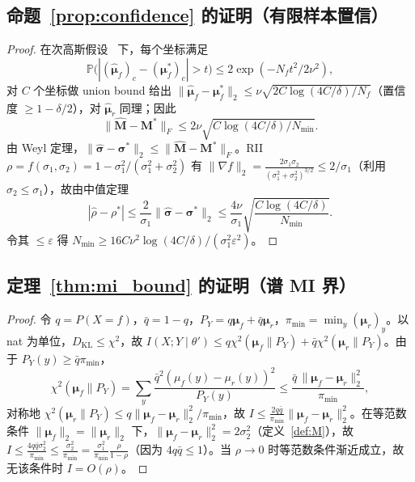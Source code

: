 \subsection{命题~\ref{prop:confidence} 的证明（有限样本置信）}
\label{app:confidence}
\begin{proof}
在次高斯假设~\cite{vershynin2018high} 下，每个坐标满足
\begin{equation}
\mathbb{P}\bigl(|(\hat{\boldsymbol{\mu}}_f)_c-(\boldsymbol{\mu}_f^*)_c|>t\bigr)\le 2\exp(-N_ft^2/2\nu^2),
\end{equation}
对 $C$ 个坐标做 union bound 给出 $\|\hat{\boldsymbol{\mu}}_f-\boldsymbol{\mu}_f^*\|_2\le\nu\sqrt{2C\log(4C/\delta)/N_f}$（置信度 $\ge1-\delta/2$），对 $\hat{\boldsymbol{\mu}}_r$ 同理；因此
\begin{equation}
\|\hat{\mathbf{M}}-\mathbf{M}^*\|_F\le2\nu\sqrt{C\log(4C/\delta)/N_{\min}}.
\end{equation}
由 Weyl 定理，$\|\hat{\boldsymbol{\sigma}}-\boldsymbol{\sigma}^*\|_2\le\|\hat{\mathbf{M}}-\mathbf{M}^*\|_F$。RII $\rho=f(\sigma_1,\sigma_2)=1-\sigma_1^2/(\sigma_1^2+\sigma_2^2)$ 有 $\|\nabla f\|_2=\frac{2\sigma_1\sigma_2}{(\sigma_1^2+\sigma_2^2)^{3/2}}\le2/\sigma_1$（利用 $\sigma_2\le\sigma_1$），故由中值定理
\begin{equation}
|\hat{\rho}-\rho^*|\le\frac{2}{\sigma_1}\|\hat{\boldsymbol{\sigma}}-\boldsymbol{\sigma}^*\|_2\le\frac{4\nu}{\sigma_1}\sqrt{\frac{C\log(4C/\delta)}{N_{\min}}}.
\end{equation}
令其 $\le\varepsilon$ 得 $N_{\min}\ge16C\nu^2\log(4C/\delta)/(\sigma_1^2\varepsilon^2)$。
\end{proof}

\subsection{定理~\ref{thm:mi_bound} 的证明（谱 MI 界）}
\label{app:mi_bound}
\begin{proof}
令 $q=P(X{=}f)$，$\bar{q}=1-q$，$P_Y=q\boldsymbol{\mu}_f+\bar{q}\boldsymbol{\mu}_r$，$\pi_{\min}=\min_y (\boldsymbol{\mu}_r)_y$。以 nat 为单位，$D_{\mathrm{KL}}\le\chi^2$，故 $I(X;Y\mid\theta')\le q\chi^2(\boldsymbol{\mu}_f\|P_Y)+\bar{q}\chi^2(\boldsymbol{\mu}_r\|P_Y)$。由于 $P_Y(y)\ge\bar{q}\pi_{\min}$，
\begin{equation}
\chi^2(\boldsymbol{\mu}_f\|P_Y)=\sum_y\frac{\bar{q}^2(\mu_f(y)-\mu_r(y))^2}{P_Y(y)}\le\frac{\bar{q}\,\|\boldsymbol{\mu}_f-\boldsymbol{\mu}_r\|_2^2}{\pi_{\min}},
\end{equation}
对称地 $\chi^2(\boldsymbol{\mu}_r\|P_Y)\le q\|\boldsymbol{\mu}_f-\boldsymbol{\mu}_r\|_2^2/\pi_{\min}$，故 $I\le\frac{2q\bar{q}}{\pi_{\min}}\|\boldsymbol{\mu}_f-\boldsymbol{\mu}_r\|_2^2$。在等范数条件 $\|\boldsymbol{\mu}_f\|_2=\|\boldsymbol{\mu}_r\|_2$ 下，$\|\boldsymbol{\mu}_f-\boldsymbol{\mu}_r\|_2^2=2\sigma_2^2$（定义~\ref{def:M}），故 $I\le\frac{4q\bar{q}\sigma_2^2}{\pi_{\min}}\le\frac{\sigma_2^2}{\pi_{\min}}=\frac{\sigma_1^2}{\pi_{\min}}\frac{\rho}{1-\rho}$（因为 $4q\bar{q}\le1$）。当 $\rho\to0$ 时等范数条件渐近成立，故无该条件时 $I=O(\rho)$。
\end{proof}

